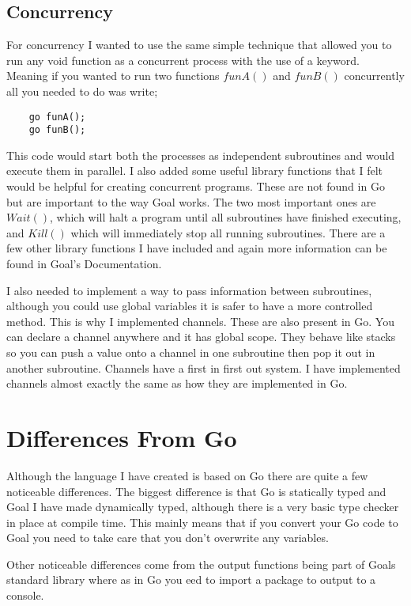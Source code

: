 \subsection{Concurrency}

For concurrency I wanted to use the same simple technique that allowed you to run any void function as a concurrent process with the use of a keyword. Meaning if you wanted to run two functions $funA()$ and $funB()$ concurrently all you needed to do was write;

\begin{lstlisting}
	go funA();
	go funB();	
\end{lstlisting}
This code would start both the processes as independent subroutines and would execute them in parallel. I also added some useful library functions that I felt would be helpful for creating concurrent programs. These are not found in Go but are important to the way Goal works. The two most important ones are $Wait()$, which will halt a program until all subroutines have finished executing, and $Kill()$ which will immediately stop all running subroutines. There are a few other library functions I have included and again more information can be found in Goal's Documentation.  

I also needed to implement a way to pass information between subroutines, although you could use global variables it is safer to have a more controlled method. This is why I implemented channels. These are also present in Go. You can declare a channel anywhere and it has global scope. They behave like stacks so you can push a value onto a channel in one subroutine then pop it out in another subroutine. Channels have a first in first out system. I have implemented channels almost exactly the same as how they are implemented in Go. 

\section{Differences From Go}

Although the language I have created is based on Go there are quite a few noticeable differences. The biggest difference is that Go is statically typed and Goal I have made dynamically typed, although there is a very basic type checker in place at compile time. This mainly means that if you convert your Go code to Goal you need to take care that you don't overwrite any variables.

Other noticeable differences come from the output functions being part of Goals standard library where as in Go you eed to import a package to output to a console.

